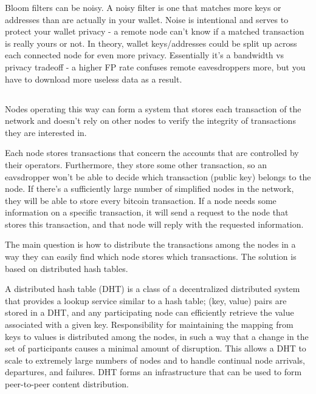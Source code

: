 \documentclass[a4paper,12pt]{article}
\begin{document}
Bloom filters can be noisy. A noisy filter is one that matches more keys or addresses than are actually in your wallet. Noise is intentional and serves to protect your wallet privacy - a remote node can't know if a matched transaction is really yours or not. In theory, wallet keys/addresses could be split up across each connected node for even more privacy. Essentially it's a bandwidth vs privacy tradeoff - a higher FP rate confuses remote eavesdroppers more, but you have to download more useless data as a result.



\subsection{}
Nodes operating this way can form a system that stores each transaction of the network and doesn't rely on other nodes to verify the integrity of transactions they are interested in.

Each node stores transactions that concern the accounts that are controlled by their operators. Furthermore, they store some other transaction, so an eavsdropper won't be able to decide which transaction (public key) belongs to the node. If there's a sufficiently large number of simplified nodes in the network, they will be able to store every bitcoin transaction. If a node needs some information on a specific transaction, it will send a request to the node that stores this transaction, and that node will reply with the requested information.

The main question is how to distribute the transactions among the nodes in a way they can easily find which node stores which transactions.
The solution is based on distributed hash tables. 

A distributed hash table (DHT) is a class of a decentralized distributed system that provides a lookup service similar to a hash table; (key, value) pairs are stored in a DHT, and any participating node can efficiently retrieve the value associated with a given key. Responsibility for maintaining the mapping from keys to values is distributed among the nodes, in such a way that a change in the set of participants causes a minimal amount of disruption. This allows a DHT to scale to extremely large numbers of nodes and to handle continual node arrivals, departures, and failures. DHT forms an infrastructure that can be used to form peer-to-peer content distribution.
\end{document}
